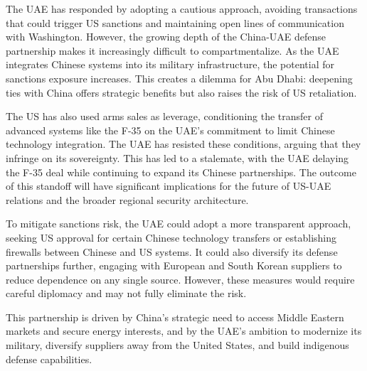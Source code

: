 \documentclass[10pt,a4paper]{article}
\begin{document}
{\small The UAE has responded by adopting a cautious approach, avoiding transactions that could trigger US sanctions and maintaining open lines of communication with Washington. However, the growing depth of the China-UAE defense partnership makes it increasingly difficult to compartmentalize. As the UAE integrates Chinese systems into its military infrastructure, the potential for sanctions exposure increases. This creates a dilemma for Abu Dhabi: deepening ties with China offers strategic benefits but also raises the risk of US retaliation.}\par
{\small The US has also used arms sales as leverage, conditioning the transfer of advanced systems like the F-35 on the UAE's commitment to limit Chinese technology integration. The UAE has resisted these conditions, arguing that they infringe on its sovereignty. This has led to a stalemate, with the UAE delaying the F-35 deal while continuing to expand its Chinese partnerships. The outcome of this standoff will have significant implications for the future of US-UAE relations and the broader regional security architecture.}\par
{\small To mitigate sanctions risk, the UAE could adopt a more transparent approach, seeking US approval for certain Chinese technology transfers or establishing firewalls between Chinese and US systems. It could also diversify its defense partnerships further, engaging with European and South Korean suppliers to reduce dependence on any single source. However, these measures would require careful diplomacy and may not fully eliminate the risk.}\par
{\small This partnership is driven by China's strategic need to access Middle Eastern markets and secure energy interests, and by the UAE's ambition to modernize its military, diversify suppliers away from the United States, and build indigenous defense capabilities.}\par
\label{chap:4:end}
\end{document}
